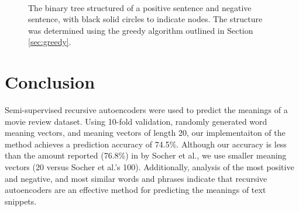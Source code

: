 \documentclass{article}
\begin{document}
\begin{figure}[t]
    \centering
    \mbox{ \quad
        }
    \caption{The binary tree structured of a positive sentence and negative sentence, with black solid circles to indicate nodes. The structure was determined using the greedy algorithm outlined in Section \ref{sec:greedy}.}
    \label{fig:tree}
\end{figure}


\section{Conclusion}
Semi-supervised recursive autoencoders were used to predict the meanings of a movie review dataset. Using 10-fold validation, randomly generated word meaning vectors, and meaning vectors of length 20, our implementaiton of the method achieves a prediction accuracy of 74.5\%. Although our accuracy is less than the amount reported (76.8\%) in by Socher et al., we use smaller meaning vectors (20 versus Socher et al.'s 100). Additionally, analysis of the most positive and negative, and most similar words and phrases indicate that recursive autoencoders are an effective method for predicting the meanings of text snippets.



\small{


}
\end{document}
